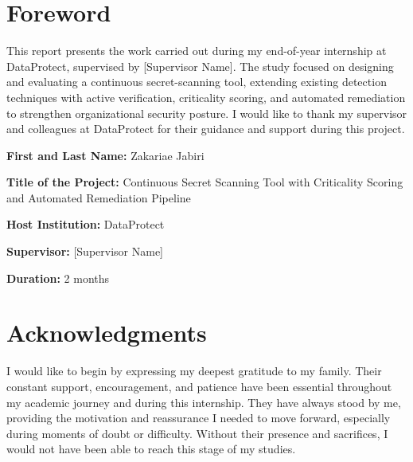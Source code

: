 \documentclass[12pt]{article}
\begin{document}
\tableofcontents
\clearpage
{}
\hypersetup{pageanchor=true}

\section*{Foreword}

This report presents the work carried out during my end-of-year internship at
DataProtect, supervised by [Supervisor Name]. The study focused on designing
and evaluating a continuous secret-scanning tool, extending existing detection
techniques with active verification, criticality scoring, and automated
remediation to strengthen organizational security posture. I would like to
thank my supervisor and colleagues at DataProtect for their guidance and
support during this project.

\textbf{First and Last Name:} Zakariae Jabiri

\textbf{Title of the Project:} Continuous Secret Scanning Tool with
Criticality Scoring and Automated Remediation Pipeline

\textbf{Host Institution:} DataProtect

\textbf{Supervisor:} [Supervisor Name]

\textbf{Duration:} 2 months

\newpage

\section*{Acknowledgments}

I would like to begin by expressing my deepest gratitude to my family. Their
constant support, encouragement, and patience have been essential throughout
my academic journey and during this internship. They have always stood by me,
providing the motivation and reassurance I needed to move forward, especially
during moments of doubt or difficulty. Without their presence and sacrifices,
I would not have been able to reach this stage of my studies.
\end{document}
